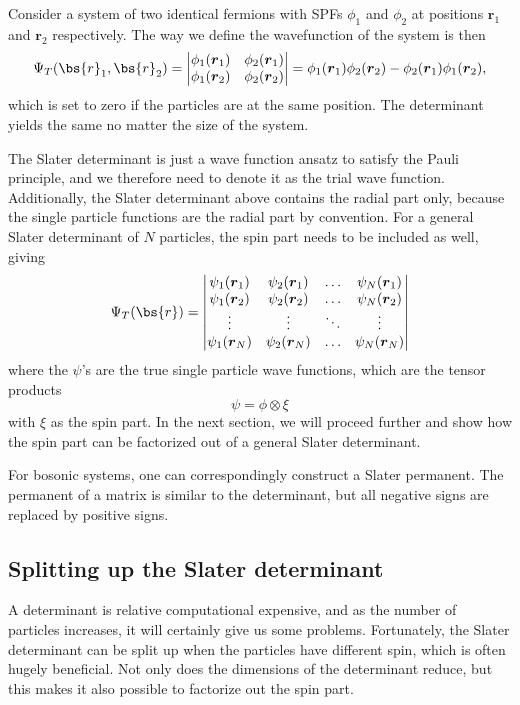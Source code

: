 Consider a system of two identical fermions with SPFs $\phi_1$ and $\phi_2$ at positions $\boldsymbol{r}_1$ and $\boldsymbol{r}_2$ respectively. The way we define the wavefunction of the system is then
\begin{equation}
\Psi_T(\bs{r}_1,\bs{r}_2)=
\begin{vmatrix}
\phi_1(\boldsymbol{r}_1) & \phi_2(\boldsymbol{r}_1)\\
\phi_1(\boldsymbol{r}_2) & \phi_2(\boldsymbol{r}_2)
\end{vmatrix}
=\phi_1(\boldsymbol{r}_1)\phi_2(\boldsymbol{r}_2)-\phi_2(\boldsymbol{r}_1)\phi_1(\boldsymbol{r}_2),
\end{equation}
which is set to zero if the particles are at the same position. The determinant yields the same no matter the size of the system.

The Slater determinant is just a wave function ansatz to satisfy the Pauli principle, and we therefore need to denote it as the trial wave function. Additionally, the Slater determinant above contains the radial part only, because the single particle functions are the radial part by convention. For a general Slater determinant of $N$ particles, the spin part needs to be included as well, giving 
\begin{equation}
\Psi_T(\bs{r})=
\begin{vmatrix}
\psi_1(\boldsymbol{r}_1) & \psi_2(\boldsymbol{r}_1) & \hdots & \psi_N(\boldsymbol{r}_1)\\
\psi_1(\boldsymbol{r}_2) & \psi_2(\boldsymbol{r}_2) & \hdots & \psi_N(\boldsymbol{r}_2)\\
\vdots & \vdots & \ddots & \vdots \\
\psi_1(\boldsymbol{r}_N) & \psi_2(\boldsymbol{r}_N) & \hdots & \psi_N(\boldsymbol{r}_N)
\end{vmatrix}
\end{equation}
where the $\psi$'s are the true single particle wave functions, which are the tensor products 
\begin{equation}
\psi=\phi\otimes\xi
\end{equation}
with $\xi$ as the spin part. In the next section, we will proceed further and show how the spin part can be factorized out of a general Slater determinant.

For bosonic systems, one can correspondingly construct a Slater permanent. The permanent of a matrix is similar to the determinant, but all negative signs are replaced by positive signs. 

\subsection{Splitting up the Slater determinant} \label{subsec:electronsystem}
A determinant is relative computational expensive, and as the number of particles increases, it will certainly give us some problems. Fortunately, the Slater determinant can be split up when the particles have different spin, which is often hugely beneficial. Not only does the dimensions of the determinant reduce, but this makes it also possible to factorize out the spin part.

